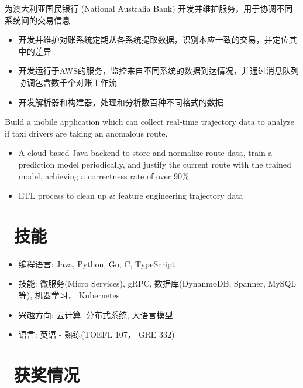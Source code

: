 \documentclass{resume}
\begin{document}
\begin{onehalfspacing}
为澳大利亚国民银行 (National Australia Bank) 开发并维护服务，用于协调不同系统间的交易信息
\begin{itemize}
  \item 开发并维护对账系统定期从各系统提取数据，识别本应一致的交易，并定位其中的差异
  \item 开发运行于AWS的服务，监控来自不同系统的数据到达情况，并通过消息队列协调包含数千个对账工作流
  \item 开发解析器和构建器，处理和分析数百种不同格式的数据
\end{itemize}
\end{onehalfspacing}

Build a mobile application which can collect real-time trajectory data to analyze if taxi drivers are taking an anomalous route.
\begin{itemize}
 \item A cloud-based Java backend to store and normalize route data, train a prediction model periodically, \linebreak and justify the current route with the trained model, achieving a correctness rate of over 90\%
 \item ETL process to clean up \& feature engineering trajectory data
\end{itemize}

\section{\faCogs\ 技能}
\begin{itemize}[parsep=0.5ex]
  \item 编程语言: Java, Python, Go, C, TypeScript
  \item 技能: 微服务(Micro Services), gRPC, 数据库(DynanmoDB, Spanner, MySQL等), 机器学习， Kubernetes
  \item 兴趣方向: 云计算, 分布式系统, 大语言模型
  \item 语言: 英语 - 熟练(TOEFL 107， GRE 332)
\end{itemize}

\section{\faHeartO\ 获奖情况}

%
%
\end{document}
